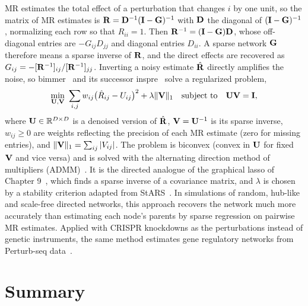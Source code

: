 MR estimates the total effect of a perturbation that changes $i$ by one unit, so the matrix of MR estimates is $\mathbf{R}=\mathbf{D}^{-1}(\mathbf{I}-\mathbf{G})^{-1}$ with $\mathbf{D}$ the diagonal of $(\mathbf{I}-\mathbf{G})^{-1}$, normalizing each row so that $R_{ii}=1$. Then $\mathbf{R}^{-1}=(\mathbf{I}-\mathbf{G})\mathbf{D}$, whose off-diagonal entries are $-G_{ij}D_{jj}$ and diagonal entries $D_{ii}$. A sparse network $\mathbf{G}$ therefore means a sparse inverse of $\mathbf{R}$, and the direct effects are recovered as $G_{ij}=-[\mathbf{R}^{-1}]_{ij}/[\mathbf{R}^{-1}]_{jj}$. Inverting a noisy estimate $\hat{\mathbf{R}}$ directly amplifies the noise, so bimmer~\citep{brown2020bimmer} and its successor inspre~\citep{brown2023inspre} solve a regularized problem,
\begin{equation}
  \min_{\mU,\mV}\ \sum_{i,j}w_{ij}\big(\hat R_{ij}-U_{ij}\big)^2 + \lambda\|\mV\|_1 \quad\text{subject to}\quad \mU\mV=\mI,
\end{equation}
where $\mathbf{U}\in\mathbb{R}^{D\times D}$ is a denoised version of $\hat{\mathbf{R}}$, $\mathbf{V}=\mathbf{U}^{-1}$ is its sparse inverse, $w_{ij}\geq0$ are weights reflecting the precision of each MR estimate (zero for missing entries), and $\|\mathbf{V}\|_1=\sum_{ij}|V_{ij}|$. The problem is biconvex (convex in $\mathbf{U}$ for fixed $\mathbf{V}$ and vice versa) and is solved with the alternating direction method of multipliers (ADMM)~\citep{boyd2011admm}. It is the directed analogue of the graphical lasso of Chapter 9~\citep{friedman2008}, which finds a sparse inverse of a covariance matrix, and $\lambda$ is chosen by a stability criterion adapted from StARS~\citep{liu2010stars}. In simulations of random, hub-like and scale-free directed networks, this approach recovers the network much more accurately than estimating each node's parents by sparse regression on pairwise MR estimates. Applied with CRISPR knockdowns as the perturbations instead of genetic instruments, the same method estimates gene regulatory networks from Perturb-seq data~\citep{brown2023inspre}.

\section{Summary}

